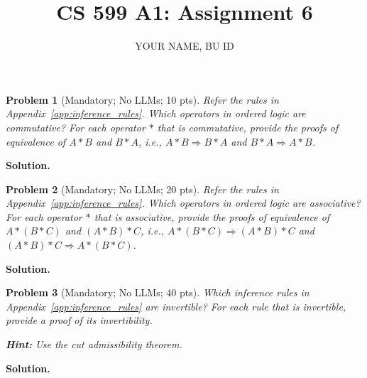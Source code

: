 \documentclass{article}
\title{CS 599 A1: Assignment 6}
\author{YOUR NAME, BU ID}
\date{}
\newcommand{\seq}{\Longrightarrow}
\newtheorem{problem}{Problem}
\newenvironment{solution}{\textbf{Solution.}}{}
\begin{document}
\maketitle


\begin{problem}[Mandatory; No LLMs; 10 pts]
    Refer the rules in Appendix~\ref{app:inference_rules}. Which operators in ordered logic are commutative?
    For each operator $*$ that is commutative, provide the proofs of equivalence of $A * B$ and $B * A$,
    i.e., $A * B \seq B * A$ and $B * A \seq A * B$.
\end{problem}

\begin{solution}

\end{solution}

\begin{problem}[Mandatory; No LLMs; 20 pts]
    Refer the rules in Appendix~\ref{app:inference_rules}. Which operators in ordered logic are associative?
    For each operator $*$ that is associative, provide the proofs of equivalence of $A * (B * C)$ and $(A * B) * C$,
    i.e., $A * (B * C) \seq (A * B) * C$ and $(A * B) * C \seq A * (B * C)$.
\end{problem}

\begin{solution}
    
\end{solution}

\begin{problem}[Mandatory; No LLMs; 40 pts]
Which inference rules in Appendix~\ref{app:inference_rules} are invertible? For each rule that is invertible,
provide a proof of its invertibility.

\textbf{Hint:} Use the cut admissibility theorem.
\end{problem}

\begin{solution}
    
\end{solution}
\end{document}
